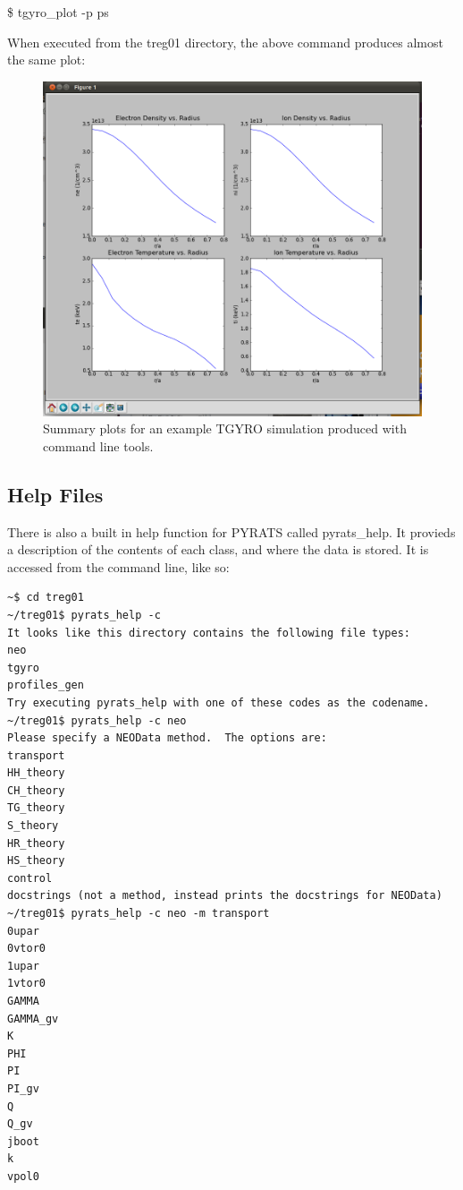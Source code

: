 \documentclass{article}
\begin{document}
\fontfamily{\ttdefault}\selectfont

\$ tgyro\_plot -p ps

\fontfamily{\rmdefault}\selectfont

\noindent When executed from the treg01 directory, the above command produces almost the same plot:

\begin{figure}[H]
  \centering
    \includegraphics[scale=.35]{pssht2.png}
  \caption{Summary plots for an example TGYRO simulation produced with command line tools.}
\end{figure}

\subsection{Help Files}
\noindent There is also a built in help function for PYRATS called pyrats\_help.  It provieds a description of the contents of each class, and where the data is stored.  It is accessed from the command line, like so:
\begin{verbatim}
~$ cd treg01
~/treg01$ pyrats_help -c
It looks like this directory contains the following file types:
neo
tgyro
profiles_gen
Try executing pyrats_help with one of these codes as the codename.
~/treg01$ pyrats_help -c neo
Please specify a NEOData method.  The options are:
transport
HH_theory
CH_theory
TG_theory
S_theory
HR_theory
HS_theory
control
docstrings (not a method, instead prints the docstrings for NEOData)
~/treg01$ pyrats_help -c neo -m transport
0upar
0vtor0
1upar
1vtor0
GAMMA
GAMMA_gv
K
PHI
PI
PI_gv
Q
Q_gv
jboot
k
vpol0
\end{verbatim}
\end{document}

